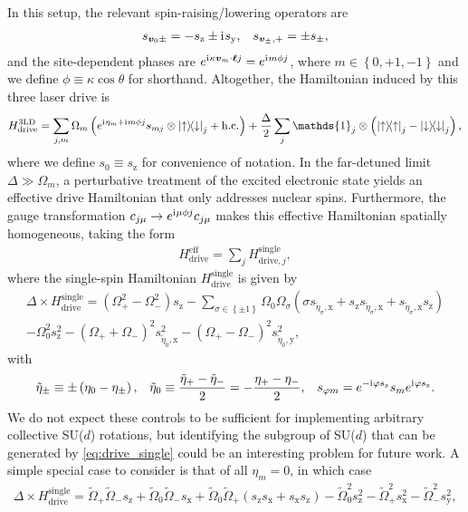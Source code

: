 \documentclass[nofootinbib,notitlepage,11pt]{revtex4-2}
\renewcommand{\t}{\text} %
\newcommand{\f}[2]{\dfrac{#1}{#2}} %
\newcommand{\p}[1]{\left(#1\right)} %
\renewcommand{\set}[1]{\left\{#1\right\}} %
\renewcommand{\v}{\bm} %
\renewcommand{\c}{\cdot} %
\renewcommand{\i}{\mathrm{i}\mkern1mu} %
\newcommand{\1}{\mathds{1}}
\newcommand{\up}{\uparrow}
\newcommand{\dn}{\downarrow}
\newcommand{\x}{\text{x}}
\newcommand{\y}{\text{y}}
\newcommand{\z}{\text{z}}
\begin{document}
In this setup, the relevant spin-raising/lowering operators are
\begin{align}
  s_{\v v_0\pm} = -s_\z \pm \i s_\y,
  &&
  s_{\v v_\pm,+} = \pm s_\pm,
\end{align}
and the site-dependent phases are $e^{\i\kappa\v v_m\c\v\ell j}=e^{\i m\phi j}$, where $m\in\set{0,+1,-1}$ and we define $\phi\equiv\kappa\cos\theta$ for shorthand.
Altogether, the Hamiltonian induced by this three laser drive is
\begin{align}
  H_{\t{drive}}^{\t{3LD}} = \sum_{j,m} \Omega_m
  \p{e^{\i\eta_m+\i m\phi j} s_{mj} \otimes\op{\up}{\dn}_j + \t{h.c.}}
  + \f{\Delta}{2} \sum_j \1_j \otimes\p{\op\up_j-\op\dn_j},
\end{align}
where we define $s_0\equiv s_\z$ for convenience of notation.
In the far-detuned limit $\Delta\gg\Omega_m$, a perturbative treatment of the excited electronic state yields an effective drive Hamiltonian that only addresses nuclear spins.
Furthermore, the gauge transformation $c_{j\mu}\to e^{\i\mu\phi j} c_{j\mu}$ makes this effective Hamiltonian spatially homogeneous, taking the form
\begin{align}
  H_{\t{drive}}^{\t{eff}} = \sum_j H_{\t{drive},j}^{\t{single}},
\end{align}
where the single-spin Hamiltonian $H_{\t{drive}}^{\t{single}}$ is given by
\begin{multline}
  \Delta \times H_{\t{drive}}^{\t{single}}
  = \p{\Omega_+^2 - \Omega_-^2} s_\z
  - \sum_{\sigma\in\set{\pm1}} \Omega_0 \Omega_\sigma
  \p{\sigma s_{\tilde\eta_\sigma,\x}
    + s_\z s_{\tilde\eta_\sigma,\x} + s_{\tilde\eta_\sigma,\x} s_\z} \\
  - \Omega_0^2 s_\z^2
  - \p{\Omega_+ + \Omega_-}^2 s_{\tilde\eta_0,\x}^2
  - \p{\Omega_+ - \Omega_-}^2 s_{\tilde\eta_0,\y}^2,
  \label{eq:drive_single}
\end{multline}
with
\begin{align}
  \tilde\eta_\pm \equiv \pm\p{\eta_0 - \eta_\pm},
  &&
  \tilde\eta_0 \equiv \f{\tilde\eta_+ - \tilde\eta_-}{2}
  = -\f{\eta_+ - \eta_-}{2},
  &&
  s_{\varphi m} = e^{-\i\varphi s_\z} s_m e^{\i\varphi s_\z}.
\end{align}
We do not expect these controls to be sufficient for implementing arbitrary collective SU($d$) rotations, but identifying the subgroup of SU($d$) that can be generated by \eqref{eq:drive_single} could be an interesting problem for future work.
A simple special case to consider is that of all $\eta_m=0$, in which case
\begin{align}
  \Delta \times H_{\t{drive}}^{\t{single}}
  = \tilde\Omega_+ \tilde\Omega_- s_\z
  + \tilde\Omega_0 \tilde\Omega_- s_\x
  + \tilde\Omega_0 \tilde\Omega_+ \p{s_\z s_\x  + s_\x s_\z}
  - \tilde\Omega_0^2 s_\z^2 - \tilde\Omega_+^2 s_\x^2
  - \tilde\Omega_-^2 s_\y^2,
\end{align}
\end{document}
